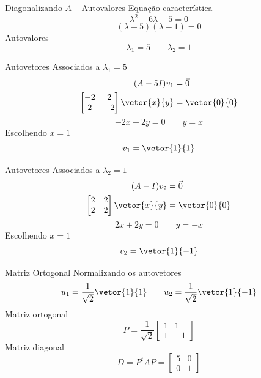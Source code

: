 \begin{resolution}{Diagonalizando $A$ -- Autovalores}
  Equação característica
  \[
    \lambda^2-6\lambda+5=0
  \]
  \[
    (\lambda-5)(\lambda-1)=0
  \]
  Autovalores
  \[
    \lambda_1=5
    \qquad
    \lambda_2=1
  \]
\end{resolution}

\begin{resolution}{Autovetores Associados a $\lambda_1=5$}
  \begin{align*}
    (A-5I)v_1 & = \vec{0} \\
    \begin{bmatrix}
      -2&2\\
      2&-2
    \end{bmatrix}
    \vetor{x}{y}
    & = \vetor{0}{0}
  \end{align*}
  \[
    -2x+2y=0
    \qquad
    y=x
  \]
  Escolhendo \(x=1\)
  \[
    v_1=\vetor{1}{1}
  \]
\end{resolution}

\begin{resolution}{Autovetores Associados a $\lambda_2=1$}
  \begin{align*}
    (A-I)v_2 & = \vec{0} \\
    \begin{bmatrix}
      2&2\\
      2&2
    \end{bmatrix}
    \vetor{x}{y}
    & = \vetor{0}{0}
  \end{align*}
  \[
    2x+2y=0
    \qquad
    y=-x
  \]
  Escolhendo \(x=1\)
  \[
    v_2=\vetor{1}{-1}
  \]
\end{resolution}

\begin{resolution}{Matriz Ortogonal}
  Normalizando os autovetores
  \[
    u_1=\frac{1}{\sqrt{2}}\vetor{1}{1}
    \qquad
    u_2=\frac{1}{\sqrt{2}}\vetor{1}{-1}
  \]
  Matriz ortogonal
  \[
    P=\frac{1}{\sqrt{2}}
    \begin{bmatrix}
      1&1\\
      1&-1
    \end{bmatrix}
  \]
  Matriz diagonal
  \[
    D=P^tAP
    =\begin{bmatrix}
      5&0\\
      0&1
    \end{bmatrix}
  \]
\end{resolution}

